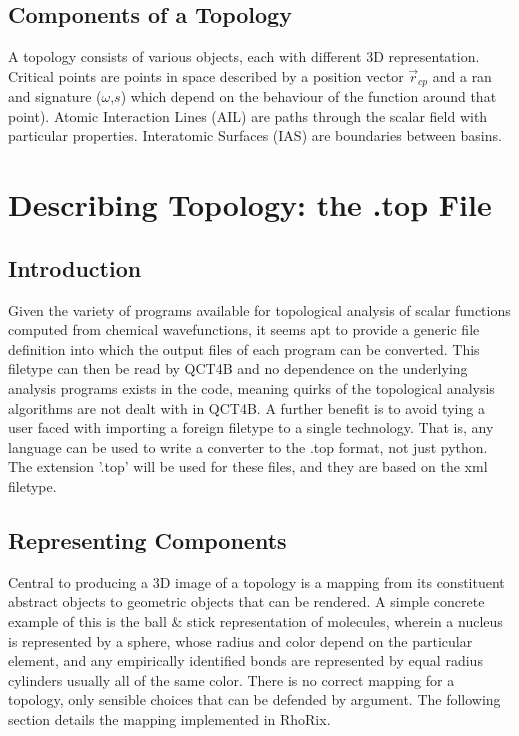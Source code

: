 \documentclass{tufte-book}
\newcommand{\programName}{RhoRix}
\begin{document}
\section{Components of a Topology}

A topology consists of various objects, each with different 3D representation. 
Critical points are points in space described by a position vector $\vec{r}_{cp}$ and a ran and signature ($\omega$,$s$) 
which depend on the behaviour of the function around that point).
Atomic Interaction Lines (AIL) are paths through the scalar field with particular properties.
Interatomic Surfaces (IAS) are boundaries between basins.

\chapter{Describing Topology: the .top File}

\section{Introduction}

Given the variety of programs available for topological analysis of scalar functions computed from chemical 
wavefunctions, it seems apt to provide a generic file definition into which the output files of each program 
can be converted.
This filetype can then be read by QCT4B and no dependence on the underlying analysis programs exists in the code, 
meaning quirks of the topological analysis algorithms are not dealt with in QCT4B.
A further benefit is to avoid tying a user faced with importing a foreign filetype to a single technology.
That is, any language can be used to write a converter to the .top format, not just python.
The extension '.top' will be used for these files, and they are based on the xml filetype.

\section{Representing Components}

Central to producing a 3D image of a topology is a mapping from its constituent abstract objects to geometric objects that can be rendered. A simple concrete example of this is the ball & stick representation of molecules, wherein a nucleus is represented by a sphere, whose radius and color depend on the particular element, and any empirically identified bonds are represented by equal radius cylinders usually all of the same color. 
There is no correct mapping for a topology, only sensible choices that can be defended by argument. The following section details the mapping implemented in \programName{}.
\end{document}
